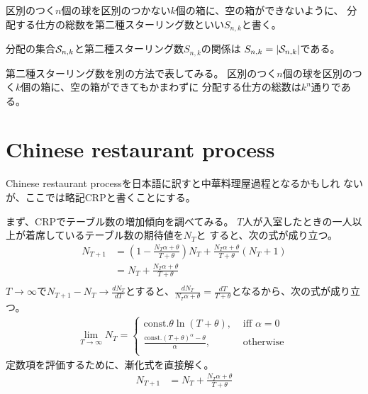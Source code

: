 	\begin{definition}[第二種スターリング数]\label{def:第二種スターリング数} %
		区別のつく$n$個の球を区別のつかない$k$個の箱に、空の箱ができないように、
		分配する仕方の総数を第二種スターリング数といい$S_{n,k}$と書く。
	\end{definition} %

	分配の集合${\mathcal{S}}_{n,k}$と第二種スターリング数$S_{n,k}$の関係は
	$S_{n,k}=\left|{{\mathcal{S}}_{n,k}}\right|$である。

	第二種スターリング数を別の方法で表してみる。
	区別のつく$n$個の球を区別のつく$k$個の箱に、空の箱ができてもかまわずに
	分配する仕方の総数は$k^n$通りである。

\section{Chinese restaurant process}\label{s1:Chinese restaurant process} %
	Chinese restaurant processを日本語に訳すと中華料理屋過程となるかもしれ
	ないが、ここでは略記CRPと書くことにする。

	まず、CRPでテーブル数の増加傾向を調べてみる。
	$T$人が入室したときの一人以上が着席しているテーブル数の期待値を$N_T$と
	すると、次の式が成り立つ。
	\begin{equation*}\begin{split} %
		N_{T+1} & = (1-\frac{N_T\alpha+\theta}{T+\theta})N_T
			+ \frac{N_T\alpha+\theta}{T+\theta}(N_T+1) \\
		& = N_T + \frac{N_T\alpha+\theta}{T+\theta} \\
	\end{split}\end{equation*} %
	$T\to\infty$で$N_{T+1}-N_T\to \frac{dN_T}{dT}$とすると、$
		\frac{dN_T}{N_T\alpha+\theta} = \frac{dT}{T+\theta}
	$となるから、次の式が成り立つ。
	\begin{equation*}\begin{split} %
		\lim_{T\to\infty}N_T = \begin{cases}
			\text{const.}\theta\ln(T+\theta), &\text{ iff }\alpha=0 \\
			\frac{\text{const.}(T+\theta)^\alpha-\theta}{\alpha}, &\text{ otherwise } \\
		\end{cases}
	\end{split}\end{equation*} %
	定数項を評価するために、漸化式を直接解く。
	\begin{equation*}\begin{split} %
		N_{T+1} & = N_T + \frac{N_T\alpha+\theta}{T+\theta} \\
	\end{split}\end{equation*} %

